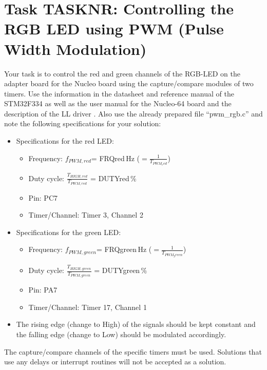 \documentclass[a4paper,12pt]{article}
\begin{document}
\pagestyle{empty}
\setlength{\parindent}{0em}
\section*{Task {{TASKNR}}: Controlling the RGB LED using PWM (Pulse Width Modulation)}

Your task is to control the red and green channels of the RGB-LED on the adapter board for the Nucleo board using the capture/compare modules of two timers. Use the information in the datasheet \cite{data_sheet} and reference manual \cite{ref_manual} of the STM32F334 as well as the user manual for the Nucleo-64 board \cite{nucleo_manual} and the description of the LL driver \cite{driver_manual}. Also use the already prepared file \enquote{pwm\_rgb.c} and note the following specifications for your solution:

\begin{itemize}
\item Specifications for the red LED:
\begin{itemize}
\item Frequency: $f_{PWM, red}$= {{FRQred}}\,Hz ($=\frac{1}{T_{PWM_red}}$)
\item Duty cycle: $\frac{T_{HIGH,red}}{T_{PWM,red}}$ = {{DUTYred}}\,\%
\item Pin: PC7
\item Timer/Channel: Timer 3, Channel 2
\end{itemize}
\item Specifications for the green LED:
\begin{itemize}
\item Frequency: $f_{PWM, green}$= {{FRQgreen}}\,Hz ($=\frac{1}{T_{PWM_green}}$)
\item Duty cycle: $\frac{T_{HIGH,green}}{T_{PWM,green}}$ = {{DUTYgreen}}\,\%
\item Pin: PA7
\item Timer/Channel: Timer 17, Channel 1
\end{itemize}
\item The rising edge (change to High) of the signals should be kept constant and the falling edge (change to Low) should be modulated accordingly.
\end{itemize}
\vspace{0.3cm}

The capture/compare channels of the specific timers must be used. Solutions that use any delays or interrupt routines will not be accepted as a solution.
\\
\end{document}
